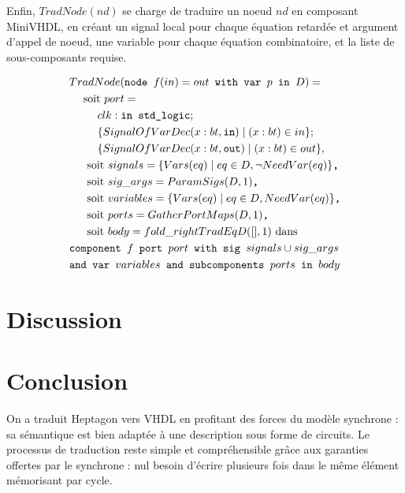 \documentclass[a4paper]{article}
\newcommand{\LANG}{{\sc Heptagon}}
\newcommand{\p}[0]{\; \vert \;}
\newcommand{\mybox}[1]{\mbox{\tt{#1}}}
\newcommand{\bl}[0]{\hspace{0.45cm}}
\begin{document}
Enfin, $TradNode(nd)$ se charge de traduire un noeud $nd$ en composant MiniVHDL, en
cr\'eant un signal local pour chaque \'equation retard\'ee et argument d'appel de
noeud, une variable pour chaque \'equation combinatoire, et la liste de
sous-composants requise.

\begin{align*}
  & TradNode(\mybox{node } f(in) = out \mybox{ with var } p \mybox{ in } D) = \\
  & \bl \mbox{soit } port = \\
  & \bl \bl clk : \mybox{in std\_logic}; \\
  & \bl \bl \{ SignalOfVarDec(x : bt, \mybox{in}) \p (x : bt) \in in \}; \\
  & \bl \bl \{ SignalOfVarDec(x : bt, \mybox{out}) \p (x : bt) \in out \}, \\
  & \bl \mbox{ soit } signals = \{ \V{eq} \p eq \in D, \neg \NV{eq} \}
  \mybox{,} \\
  & \bl \mbox{ soit } sig\_args = \PS{D}{1} \mybox{,} \\
  & \bl \mbox{ soit } variables = \{ \V{eq} \p eq \in D, \NV{eq} \} \mybox{,} \\
  & \bl \mbox{ soit } ports = \GPM{D}{1} \mybox{,} \\
  & \bl \mbox{ soit } body = fold\_right TradEq D ([], 1) \mbox{ dans} \\
  & \mybox{component } f \mybox{ port } port \mybox{ with sig } signals \cup
  sig\_args \\
  & \mybox{and var } variables \mybox{ and subcomponents } ports \mybox{ in }
  body
\end{align*}

\section{Discussion}

\section{Conclusion}

On a traduit \LANG{} vers VHDL en profitant des forces du mod\`ele synchrone : sa
s\'emantique est bien adapt\'ee \`a une description sous forme de circuits. Le
processus de traduction reste simple et compr\'ehensible gr\^ace aux garanties
offertes par le synchrone : nul besoin d'\'ecrire plusieurs fois dans le m\^eme
\'el\'ement m\'emorisant par cycle.

\newpage
\tableofcontents
\end{document}
